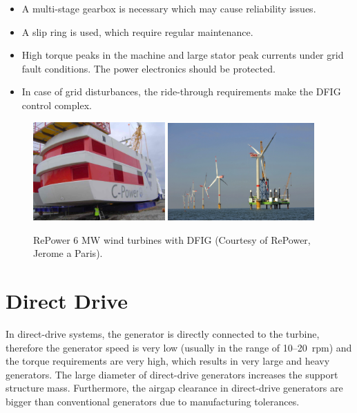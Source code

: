 \documentclass[a4paper, 11pt]{article} %
\begin{document}
\begin{itemize}
	\item A multi-stage gearbox is necessary which may cause reliability issues.
	\item A slip ring is used, which require regular maintenance.
	\item High torque peaks in the machine and large stator peak currents under grid fault conditions. The power electronics should be protected.
	\item In case of grid disturbances, the ride-through requirements make the DFIG control complex.
\end{itemize}

\begin{figure}[]
  \centering
  \includegraphics[width=0.45\textwidth]{repower_nacelle}
  \hfill
    \includegraphics[width=0.5\textwidth]{repower_farm}
\caption{RePower 6 MW wind turbines with DFIG (Courtesy of RePower, Jerome a Paris).}
  \label{repower}
\end{figure}

\section{Direct Drive}

In direct-drive systems, the generator is directly connected to the turbine, therefore the generator speed is very low (usually in the range of 10--20~rpm) and the torque requirements are very high, which results in very large and heavy generators. The large diameter of direct-drive generators increases the support structure mass. Furthermore, the airgap clearance in direct-drive generators are bigger than conventional generators due to manufacturing tolerances.
\end{document}
